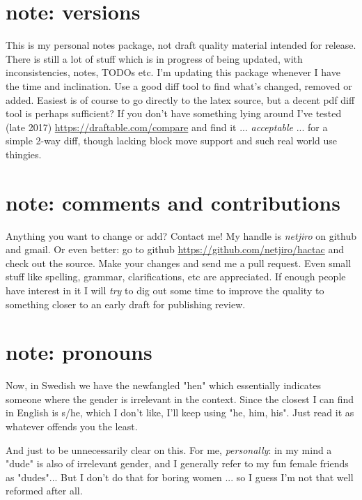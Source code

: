\documentclass[11pt, twoside, titlepage, a4paper]{report}
\begin{document}
\section*{note: versions}
This is my personal notes package, not draft quality material intended for release. There is still a lot of stuff which is in progress of being updated, with inconsistencies, notes, TODOs etc.
I'm updating this package whenever I have the time and inclination. Use a good diff tool to find what's changed, removed or added. Easiest is of course to go directly to the latex source, but a decent pdf diff tool is perhaps sufficient? If you don't have something lying around I've tested (late 2017) \url{https://draftable.com/compare} and find it ... \emph{acceptable} ... for a simple 2-way diff, though lacking block move support and such real world use thingies.


\section*{note: comments and contributions}
Anything you want to change or add? Contact me! My handle is \emph{netjiro} on github and gmail. Or even better: go to github \url{https://github.com/netjiro/hactac} and check out the source. Make your changes and send me a pull request. Even small stuff like spelling, grammar, clarifications, etc are appreciated. If enough people have interest in it I will \emph{try} to dig out some time to improve the quality to something closer to an early draft for publishing review.


\section*{note: pronouns}
Now, in Swedish we have the newfangled "hen" which essentially indicates someone where the gender is irrelevant in the context. Since the closest I can find in English is s/he, which I don't like, I'll keep using "he, him, his". Just read it as whatever offends you the least.

And just to be unnecessarily clear on this. For me, \emph{personally}: in my mind a "dude" is also of irrelevant gender, and I generally refer to my fun female friends as "dudes"... But I don't do that for boring women ... so I guess I'm not that well reformed after all.
\end{document}
